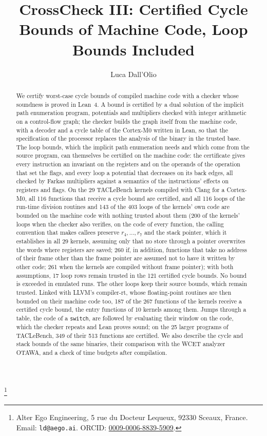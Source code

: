 \documentclass[oneside,english]{amsart}
\numberwithin{equation}{section}
\theoremstyle{plain}
\theoremstyle{definition}
\theoremstyle{plain}
\theoremstyle{plain}
\theoremstyle{remark}
\begin{document}
\title[CrossCheck III: Certified Cycle Bounds of Machine Code]{CrossCheck III: Certified Cycle Bounds of Machine Code, Loop Bounds Included}
\author{Luca Dall'Olio}
\thanks{Alter Ego Engineering, 5 rue du Docteur Lequeux, 92330 Sceaux, France. Email: \texttt{ld@aego.ai}. ORCID: \href{https://orcid.org/0009-0006-8839-5909}{0009-0006-8839-5909}.}
\begin{abstract}
We certify worst-case cycle bounds of compiled machine code with a checker whose soundness is proved in Lean~4. A bound is certified by a dual solution of the implicit path enumeration program, potentials and multipliers checked with integer arithmetic on a control-flow graph; the checker builds the graph itself from the machine code, with a decoder and a cycle table of the Cortex-M0 written in Lean, so that the specification of the processor replaces the analysis of the binary in the trusted base. The loop bounds, which the implicit path enumeration needs and which come from the source program, can themselves be certified on the machine code: the certificate gives every instruction an invariant on the registers and on the operands of the operation that set the flags, and every loop a potential that decreases on its back edges, all checked by Farkas multipliers against a semantics of the instructions' effects on registers and flags. On the 29 TACLeBench kernels compiled with Clang for a Cortex-M0, all 116 functions that receive a cycle bound are certified, and all 116 loops of the run-time division routines and 143 of the 403 loops of the kernels' own code are bounded on the machine code with nothing trusted about them (200 of the kernels' loops when the checker also verifies, on the code of every function, the calling convention that makes callees preserve $r_4, \dots, r_7$ and the stack pointer, which it establishes in all 29 kernels, assuming only that no store through a pointer overwrites the words where registers are saved; 260 if, in addition, functions that take no address of their frame other than the frame pointer are assumed not to have it written by other code; 261 when the kernels are compiled without frame pointer); with both assumptions, 17 loop rows remain trusted in the 121 certified cycle bounds. No bound is exceeded in emulated runs. The other loops keep their source bounds, which remain trusted. Linked with LLVM's compiler-rt, whose floating-point routines are then bounded on their machine code too, 187 of the 267 functions of the kernels receive a certified cycle bound, the entry functions of 10 kernels among them. Jumps through a table, the code of a \texttt{switch}, are followed by evaluating their window on the code, which the checker repeats and Lean proves sound; on the 25 larger programs of TACLeBench, 349 of their 513 functions are certified. We also describe the cycle and stack bounds of the same binaries, their comparison with the WCET analyzer OTAWA, and a check of time budgets after compilation.
\end{abstract}
\end{document}
